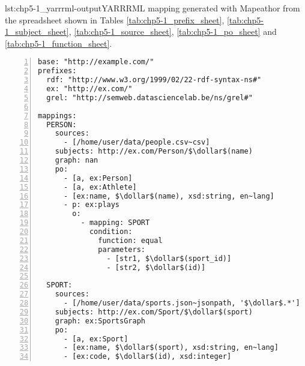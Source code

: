 \begin{captionedlisting}{lst:chp5-1_yarrrml-output}{YARRRML mapping generated with Mapeathor from the spreadsheet shown in Tables \ref{tab:chp5-1_prefix_sheet}, \ref{tab:chp5-1_subject_sheet}, \ref{tab:chp5-1_source_sheet}, \ref{tab:chp5-1_po_sheet} and \ref{tab:chp5-1_function_sheet}. }
\centering
{\begin{lstlisting}[numbers=left,basicstyle=\ttfamily\small,columns=flexible]
base: "http://example.com/"
prefixes:
  rdf: "http://www.w3.org/1999/02/22-rdf-syntax-ns#"
  ex: "http://ex.com/"
  grel: "http://semweb.datasciencelab.be/ns/grel#"

mappings:
  PERSON:
    sources:
      - [/home/user/data/people.csv~csv]
    subjects: http://ex.com/Person/$\dollar$(name)
    graph: nan
    po:
      - [a, ex:Person]
      - [a, ex:Athlete]
      - [ex:name, $\dollar$(name), xsd:string, en~lang]
      - p: ex:plays
        o:
          - mapping: SPORT
            condition:
              function: equal
              parameters:
                - [str1, $\dollar$(sport_id)]
                - [str2, $\dollar$(id)]
 
  SPORT:
    sources:
      - [/home/user/data/sports.json~jsonpath, '$\dollar$.*']
    subjects: http://ex.com/Sport/$\dollar$(sport)
    graph: ex:SportsGraph
    po:
      - [a, ex:Sport]
      - [ex:name, $\dollar$(sport), xsd:string, en~lang]
      - [ex:code, $\dollar$(id), xsd:integer]
\end{lstlisting}}
\end{captionedlisting}
\newpage